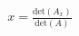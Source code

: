 \documentclass[preview]{standalone}
\begin{document}
\begin{align*}
x = \frac{\text{det}(A_x)}{\text{det}(A)}
\end{align*}
\end{document}
